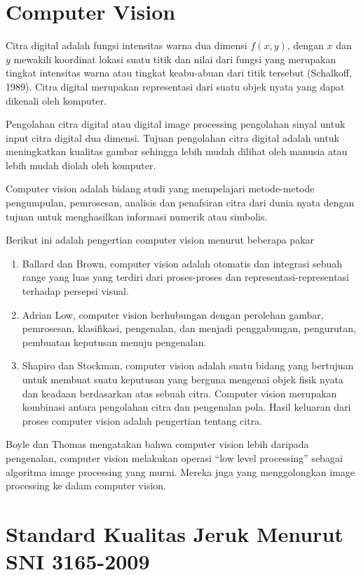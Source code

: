 \documentclass[laporan.tex]{subfiles}
\begin{document}
\section{Computer Vision}

Citra digital adalah fungsi intensitas warna dua dimensi $f(x,y)$, dengan $x$ dan $y$ mewakili koordinat lokasi suatu titik dan nilai dari fungsi yang merupakan tingkat intensitas warna atau tingkat keabu-abuan dari titik tersebut (Schalkoff, 1989). Citra digital merupakan representasi dari suatu objek nyata yang dapat dikenali oleh komputer.

Pengolahan citra digital atau digital image processing pengolahan sinyal untuk input citra digital dua dimensi. Tujuan pengolahan citra digital adalah untuk meningkatkan kualitas gambar sehingga lebih mudah dilihat oleh manusia atau lebih mudah diolah oleh komputer.

Computer vision adalah bidang studi yang mempelajari metode-metode pengumpulan, pemrosesan, analisis dan penafsiran citra dari dunia nyata dengan tujuan untuk menghasilkan informasi numerik atau simbolis.

Berikut ini adalah pengertian computer vision menurut beberapa pakar

\begin{enumerate}
\item Ballard dan Brown, computer vision adalah otomatis dan integrasi sebuah range yang luas yang terdiri dari proses-proses dan representasi-representasi terhadap persepsi visual.
\item Adrian Low, computer vision berhubungan dengan perolehan gambar, pemrosesan, klasifikasi, pengenalan, dan menjadi penggabungan, pengurutan, pembuatan keputusan menuju pengenalan.
\item Shapiro dan Stockman, computer vision adalah suatu bidang yang bertujuan untuk membuat suatu keputusan yang berguna mengenai objek fisik nyata dan keadaan berdasarkan atas sebuah citra. Computer vision merupakan kombinasi antara pengolahan citra dan pengenalan pola. Hasil keluaran dari proses computer vision adalah pengertian tentang citra.
\end{enumerate}

Boyle dan Thomas mengatakan bahwa computer vision lebih daripada pengenalan, computer vision melakukan operasi “low level processing” sebagai algoritma image processing yang murni. Mereka juga yang menggolongkan image processing ke dalam computer vision.

\section{Standard Kualitas Jeruk Menurut SNI 3165-2009}
\end{document}
